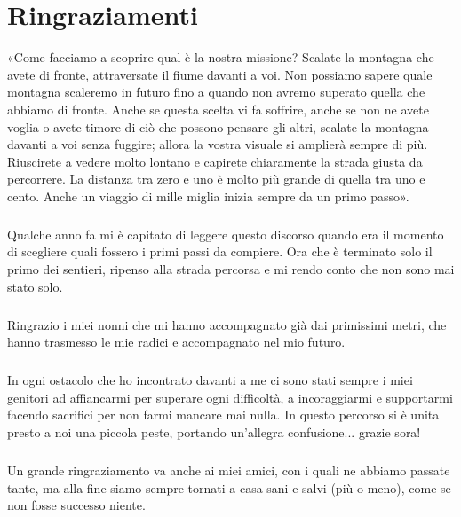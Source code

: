 \chapter{Ringraziamenti}

«Come facciamo a scoprire qual è la nostra missione?
Scalate la montagna che avete di fronte, attraversate il fiume davanti a voi.
Non possiamo sapere quale montagna scaleremo in futuro fino a quando non avremo superato quella che abbiamo di fronte.
Anche se questa	scelta vi fa soffrire, anche se non ne avete voglia o avete timore di ciò che possono pensare gli altri, scalate la montagna davanti a voi senza fuggire;
allora la vostra visuale si amplierà sempre di più.
Riuscirete a vedere molto lontano e capirete chiaramente la strada giusta da percorrere.
La distanza tra zero e uno è molto più grande di quella tra uno e cento.
Anche un viaggio di mille miglia inizia sempre da un primo passo».

\paragraph{}
Qualche anno fa mi è capitato di leggere questo discorso quando era il momento di scegliere quali fossero i primi passi da compiere. Ora che è terminato solo il primo dei sentieri, ripenso alla strada percorsa e mi rendo conto che non sono mai stato solo.

\paragraph{}
Ringrazio i miei nonni che mi hanno accompagnato già dai primissimi metri, che hanno trasmesso le mie radici e accompagnato nel mio futuro.

\paragraph{}
In ogni ostacolo che ho incontrato davanti a me ci sono stati sempre i miei genitori ad affiancarmi per superare ogni difficoltà, a incoraggiarmi e supportarmi facendo sacrifici per non farmi mancare mai nulla. In questo percorso si è unita presto a noi una piccola peste, portando un'allegra confusione... grazie sora!

\paragraph{}
Un grande ringraziamento va anche ai miei amici, con i quali ne abbiamo passate tante, ma alla fine siamo sempre tornati a casa sani e salvi (più o meno), come se non fosse successo niente.

